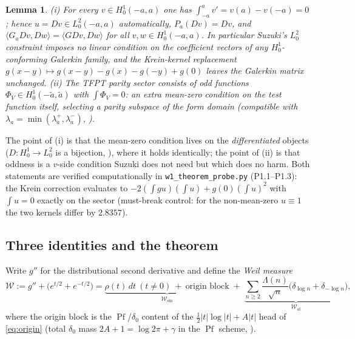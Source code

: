 \documentclass[11pt,a4paper]{article}
\newtheorem{lemma}[theorem]{Lemma}
\theoremstyle{remark}
\newcommand{\Lam}{\Lambda}
\DeclareMathOperator{\Pf}{Pf}
\begin{document}
\begin{lemma}\label{lem:proj}
(i) For every $v\in H^1_0(-a,a)$ one has $\int_{-a}^a v'=v(a)-v(-a)=0$;
hence $u=Dv\in L^2_0(-a,a)$ automatically, $P_a(Dv)=Dv$, and
$\langle G_aDv,Dw\rangle=\langle GDv,Dw\rangle$ for all
$v,w\in H^1_0(-a,a)$.  In particular Suzuki's $L^2_0$ constraint
imposes \emph{no} linear condition on the coefficient vectors of any
$H^1_0$-conforming Galerkin family, and the Krein-kernel replacement
$g(x-y)\mapsto g(x-y)-g(x)-g(-y)+g(0)$ leaves the Galerkin matrix
unchanged.  (ii) The TFPT parity sector consists of odd functions
$\Phi_V\in H^1_0(-\tilde a,\tilde a)$ with $\int\Phi_V=0$: an
\emph{extra} mean-zero condition on the test function itself, selecting
a parity subspace of the form domain (compatible with
$\lambda_a=\min(\lambda_a^+,\lambda_a^-)$,
\cite[Sec.~4.5]{Suz26}).
\end{lemma}

The point of (i) is that the mean-zero condition lives on the
\emph{differentiated} objects ($D:H^1_0\to L^2_0$ is a bijection,
\cite[Sec.~8.2]{Suz26}), where it holds identically; the point of (ii)
is that oddness is a $v$-side condition Suzuki does not need but which
does no harm.  Both statements are verified computationally in
\texttt{w1\_theorem\_probe.py} (P1.1--P1.3): the Krein correction
evaluates to $-2(\int gu)(\int u)+g(0)(\int u)^2$ with
$\int u=0$ exactly on the sector (must-break control: for the
non-mean-zero $u\equiv1$ the two kernels differ by $2.8357$).

\subsection{Three identities and the theorem}

Write $g''$ for the distributional second derivative and define the
\emph{Weil measure}
\begin{equation}\label{eq:weilmeasure}
\mathcal W:=g''+\bigl(e^{t/2}+e^{-t/2}\bigr)
=\underbrace{\rho(t)\,dt\ (t\neq0)\ +\ \text{origin
block}}_{\mathcal W_{\mathrm{sm}}}
\;+\;\underbrace{\sum_{n\ge2}\frac{\Lam(n)}{\sqrt n}
\bigl(\delta_{\log n}+\delta_{-\log n}\bigr)}_{\mathcal W_{\mathrm{at}}},
\end{equation}
where the origin block is the $\Pf$/$\delta_0$ content of the
$\tfrac12|t|\log|t|+A|t|$ head of \eqref{eq:origin} (total $\delta_0$
mass $2A+1=\log2\pi+\gamma$ in the $\Pf$ scheme,
\cite[Sec.~2.5]{Suz26}).
\end{document}
